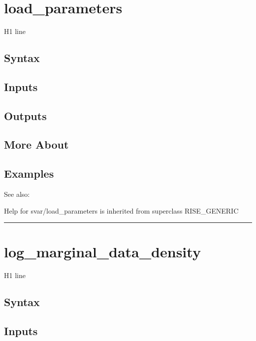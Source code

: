 \documentclass[letterpaper,10pt,english]{sphinxmanual}
\begin{document}
\section{load\_parameters}
\label{classes/models/@svar/svar:id49}\label{classes/models/@svar/svar:load-parameters}
H1 line


\subsection{Syntax}
\label{classes/models/@svar/svar:id50}

\subsection{Inputs}
\label{classes/models/@svar/svar:id51}

\subsection{Outputs}
\label{classes/models/@svar/svar:id52}

\subsection{More About}
\label{classes/models/@svar/svar:id53}

\subsection{Examples}
\label{classes/models/@svar/svar:id54}
See also:

Help for svar/load\_parameters is inherited from superclass RISE\_GENERIC


\bigskip\hrule{}\bigskip



\section{log\_marginal\_data\_density}
\label{classes/models/@svar/svar:id55}\label{classes/models/@svar/svar:log-marginal-data-density}
H1 line


\subsection{Syntax}
\label{classes/models/@svar/svar:id56}

\subsection{Inputs}
\label{classes/models/@svar/svar:id57}
\end{document}
